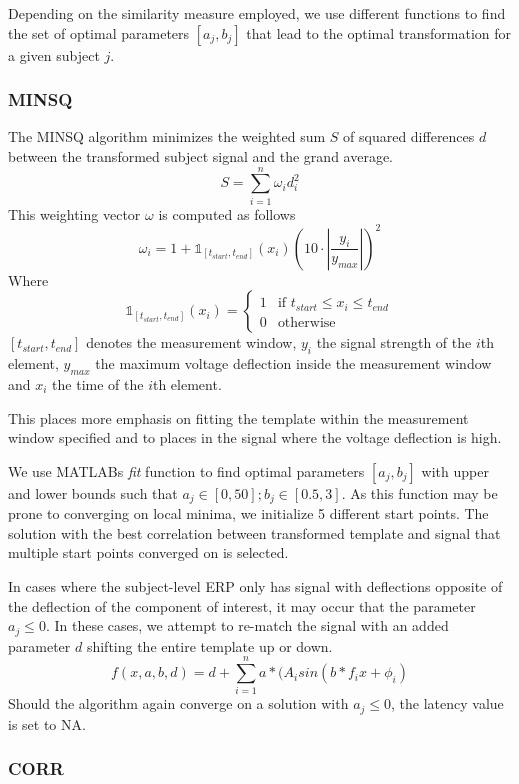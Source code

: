 \documentclass[
  man,floatsintext]{apa7}
\begin{document}
Depending on the similarity measure employed, we use different functions to find the set of optimal parameters \([a_j, b_j]\) that lead to the optimal transformation for a given subject \(j\).

\hypertarget{minsq}{%
\subsubsection{MINSQ}\label{minsq}}

The MINSQ algorithm minimizes the weighted sum \(S\) of squared differences \(d\) between the transformed subject signal and the grand average.
\[S = \sum_{i = 1}^{n}\omega_{i}d_{i}^2\]
This weighting vector \(\omega\) is computed as follows
\[\omega_i = 1+\mathbb{1}_{[t_{start}, t_{end}]}(x_i)(10 \cdot |\frac{y_i}{y_{max}}|)^2\]
Where
\[\mathbb{1}_{[t_{start}, t_{end}]}(x_i) = \begin{cases} 1 & \text{if $t_{start} \le x_i \le t_{end}$} \\ 0 & \text{otherwise}\end{cases}\]\([t_{start}, t_{end}]\) denotes the measurement window, \(y_{i}\) the signal strength of the \(i\)th element, \(y_{max}\) the maximum voltage deflection inside the measurement window and \(x_i\) the time of the \(i\)th element.

This places more emphasis on fitting the template within the measurement window specified and to places in the signal where the voltage deflection is high.

We use MATLABs \emph{fit} function to find optimal parameters \([a_j, b_j]\) with upper and lower bounds such that \(a_j \in [0, 50]; b_j \in [0.5, 3]\). As this function may be prone to converging on local minima, we initialize 5 different start points. The solution with the best correlation between transformed template and signal that multiple start points converged on is selected.

In cases where the subject-level ERP only has signal with deflections opposite of the deflection of the component of interest, it may occur that the parameter \(a_j \le 0\). In these cases, we attempt to re-match the signal with an added parameter \(d\) shifting the entire template up or down.
\[f(x, a,b, d) = d +\sum_{i = 1}^{n} a*(A_isin(b*f_ix + \phi_i)\]
Should the algorithm again converge on a solution with \(a_j \le 0\), the latency value is set to NA.

\hypertarget{corr}{%
\subsubsection{CORR}\label{corr}}
\end{document}
